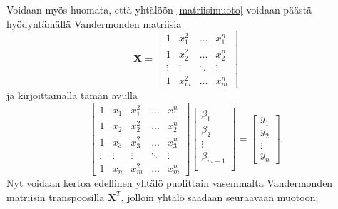 \documentclass[12pt,a4paper,titlepage]{article}
\newcommand{\matr}[1]{\bm{#1}}
\newcommand{\transpose}[1]{{#1}^T}
\begin{document}
Voidaan myös huomata, että yhtälöön \ref{matriisimuoto} voidaan päästä hyödyntämällä Vandermonden matriisia \cite{vandermonde}
\begin{equation}
	\matr{X} = 
	\begin{bmatrix}
		1 & x_{1}^2 & ...    & x_{1}^n \\
		1 & x_{2}^2 & ...    & x_{2}^n \\
		\vdots  & \vdots  & \ddots & \vdots  \\
		1 & x_{m}^2 &    ... & x_{m}^n
	\end{bmatrix}
\end{equation}
ja kirjoittamalla tämän avulla
\begin{equation} \label{matriiseilla}
	\begin{bmatrix}
			1 & x_{1} & x_{1}^2 & ...    & x_{1}^n \\
			1  & x_{2}& x_{2}^2 & ...    & x_{2}^n \\
			1  & x_{3}& x_{3}^2 & ...    & x_{3}^n \\
			\vdots  & \vdots  & \vdots & \ddots & \vdots  \\
			1  & x_{n}& x_{m}^2 &    ... & x_{m}^n
	\end{bmatrix}
	\begin{bmatrix}
		\beta_1 \\
		\beta_2 \\
		\vdots \\
		\beta_{m+1} \\
	\end{bmatrix}
	=
	\begin{bmatrix}
		y_1 \\
		y_2 \\
		\vdots \\
		y_n
	\end{bmatrix}.
\end{equation}
Nyt voidaan kertoa edellinen yhtälö puolittain vasemmalta Vandermonden matriisin transpoosilla $\transpose{\matr{X}}$, jolloin yhtälö saadaan seuraavaan muotoon:
\end{document}
